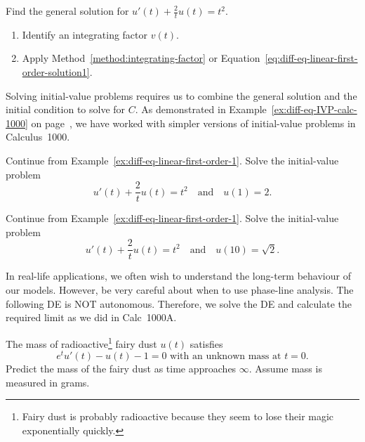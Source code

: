 \documentclass[../main.tex]{subfiles}
\begin{document}
\begin{example} \label{ex:diff-eq-linear-first-order-1}
  Find the general solution for \( u'(t) + \frac{2}{t} u(t) = t^{2}\).
  
  \begin{enumerate}[wide, label=(Step~\arabic*)]
    \item Identify an integrating factor \(v(t)\).


    \item Apply Method~\ref{method:integrating-factor} or Equation~\eqref{eq:diff-eq-linear-first-order-solution1}.

      \blanks*
  \end{enumerate}
  \vfill{}
\end{example}
\clearpage

Solving initial-value problems requires us to combine the general solution and the initial condition to solve for \(C\).  As demonstrated in Example~\ref{ex:diff-eq-IVP-calc-1000} on page~\pageref{ex:diff-eq-IVP-calc-1000}, we have worked with simpler versions of initial-value problems in Calculus~1000.

\begin{example} \label{ex:diff-eq-linear-first-first-order-1-ivp}
  Continue from Example~\ref{ex:diff-eq-linear-first-order-1}. Solve the initial-value problem 
  \[
    u'(t) + \frac{2}{t} u(t) = t^{2} \quad\text{and}\quad u(1) = 2.
  \]

\end{example}

\begin{exercise} \label{ex:linear-first-order-ivp-check}
  Continue from Example~\ref{ex:diff-eq-linear-first-order-1}. Solve the initial-value problem 
  \[
    u'(t) + \frac{2}{t} u(t) = t^{2} \quad\text{and}\quad u(10) = \sqrt{2}.
  \]

  \blanks*
\end{exercise}
\clearpage

In real-life applications, we often wish to understand the long-term behaviour of our models. However, be very careful about when to use phase-line analysis.   The following DE is NOT autonomous. Therefore, we solve the DE and calculate the required limit as we did in Calc~1000A.
\begin{exercise} \label{ex:linear-first-order-fairy-dust}
  The mass of radioactive\footnote{Fairy dust is probably radioactive because they seem to lose their magic exponentially quickly.} fairy dust \(u(t)\)  satisfies
  \[
    e^{t}u'(t) - u(t) - 1 = 0 \text{ with an unknown mass at \(t = 0\)}.
  \]
  Predict the mass of the fairy dust as time approaches \(\infty\). Assume mass is measured in grams.
  
  \blanks*
\end{exercise}
\clearpage
\end{document}
